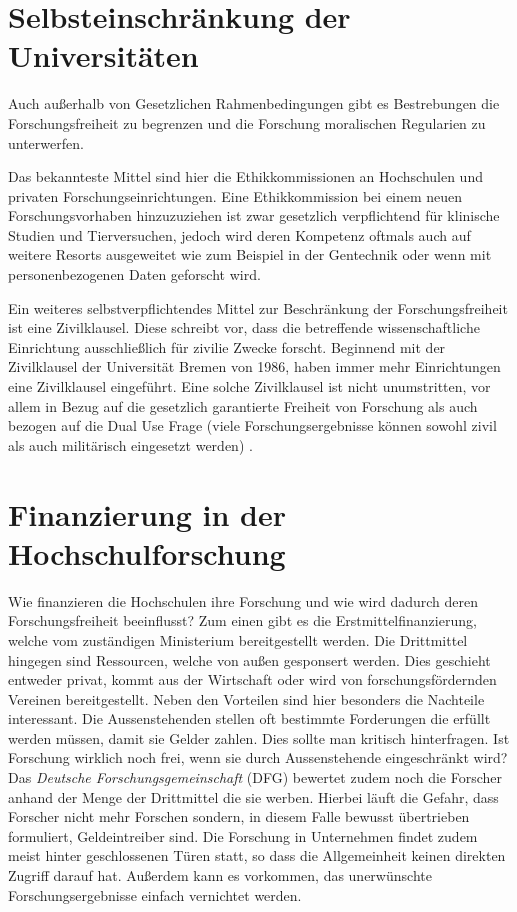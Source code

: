 \documentclass{pmwk}
\begin{document}
\section*{Selbsteinschränkung der Universitäten}
Auch außerhalb von Gesetzlichen Rahmenbedingungen gibt es Bestrebungen die Forschungsfreiheit zu begrenzen und die Forschung moralischen Regularien zu unterwerfen.\par

Das bekannteste Mittel sind hier die Ethikkommissionen an Hochschulen und privaten Forschungseinrichtungen. Eine Ethikkommission bei einem neuen Forschungsvorhaben hinzuzuziehen ist zwar gesetzlich verpflichtend für klinische Studien und Tierversuchen, jedoch wird deren Kompetenz oftmals auch auf weitere Resorts ausgeweitet wie zum Beispiel in der Gentechnik oder wenn mit personenbezogenen Daten geforscht wird.\par

Ein weiteres selbstverpflichtendes Mittel zur Beschränkung der Forschungsfreiheit ist eine Zivilklausel. Diese schreibt vor, dass die betreffende wissenschaftliche Einrichtung ausschließlich für zivilie Zwecke forscht. Beginnend mit der Zivilklausel der Universität Bremen von 1986, haben immer mehr Einrichtungen eine Zivilklausel eingeführt. Eine solche Zivilklausel ist nicht unumstritten, vor allem in Bezug auf die gesetzlich garantierte Freiheit von Forschung als auch bezogen auf die Dual Use Frage (viele Forschungsergebnisse können sowohl zivil als auch militärisch eingesetzt werden) \cite{JKrause}. 

\section*{Finanzierung in der Hochschulforschung}
Wie finanzieren die Hochschulen ihre Forschung und wie wird dadurch deren Forschungsfreiheit beeinflusst? Zum einen gibt es die Erstmittelfinanzierung, welche vom zuständigen Ministerium bereitgestellt werden. Die Drittmittel hingegen sind Ressourcen, welche von außen gesponsert werden. Dies geschieht entweder privat, kommt aus der Wirtschaft oder wird von forschungsfördernden Vereinen bereitgestellt. Neben den Vorteilen sind hier besonders die Nachteile interessant. Die Aussenstehenden stellen oft bestimmte Forderungen die erfüllt werden müssen, damit sie Gelder zahlen. Dies sollte man kritisch hinterfragen. Ist Forschung wirklich noch frei, wenn sie durch Aussenstehende eingeschränkt wird? Das \textit{Deutsche Forschungsgemeinschaft} (DFG) bewertet zudem noch die Forscher anhand der Menge der Drittmittel die sie werben. Hierbei läuft die Gefahr, dass Forscher nicht mehr Forschen sondern, in diesem Falle bewusst übertrieben formuliert, Geldeintreiber sind.  Die Forschung in Unternehmen findet zudem meist hinter geschlossenen Türen statt, so dass die Allgemeinheit keinen direkten Zugriff darauf hat. Außerdem kann es vorkommen, das unerwünschte Forschungsergebnisse einfach vernichtet werden.
\end{document}
